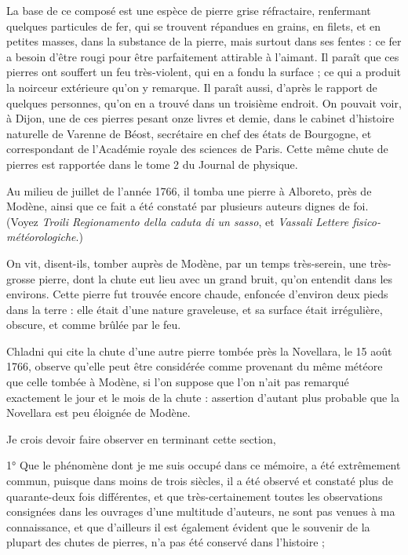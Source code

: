\documentclass[a4paper, 12pt, oneside, french]{article}
\begin{document}
La base de ce composé est une espèce de pierre grise réfractaire, renfermant quelques particules de fer, qui se trouvent répandues en grains, en filets, et en petites masses, dans la substance de la pierre, mais surtout dans ses fentes : ce fer a besoin d'être rougi pour être parfaitement attirable à l'aimant. Il paraît que ces pierres ont souffert un feu très-violent, qui en a fondu la surface ; ce qui a produit la noirceur extérieure qu'on y remarque. Il paraît aussi, d'après le rapport de quelques personnes, qu'on en a trouvé dans un troisième endroit. On pouvait voir, à Dijon, une de ces pierres pesant onze livres et demie, dans le cabinet d'histoire naturelle de Varenne de Béost, secrétaire en chef des états de Bourgogne, et correspondant de l'Académie royale des sciences de Paris. Cette même chute de pierres est rapportée dans le tome 2 du Journal de physique.

Au milieu de juillet de l'année 1766, il tomba une pierre à Alboreto, près de Modène, ainsi que ce fait a été constaté par plusieurs auteurs dignes de foi. (Voyez \emph{Troili Regionamento della caduta di un sasso}, et \emph{Vassali Lettere fisico-météorologiche}.)

On vit, disent-ils, tomber auprès de Modène, par un temps très-serein, une très-grosse pierre, dont la chute eut lieu avec un grand bruit, qu'on entendit dans les environs. Cette pierre fut trouvée encore chaude, enfoncée d'environ deux pieds dans la terre : elle était d'une nature graveleuse, et sa surface était irrégulière, obscure, et comme brûlée par le feu.

Chladni qui cite la chute d'une autre pierre tombée près la Novellara, le 15 août 1766, observe qu'elle peut être considérée comme provenant du même météore que celle tombée à Modène, si l'on suppose que l'on n'ait pas remarqué exactement le jour et le mois de la chute : assertion d'autant plus probable que la Novellara est peu éloignée de Modène.

Je crois devoir faire observer en terminant cette section,

1° Que le phénomène dont je me suis occupé dans ce mémoire, a été extrêmement commun, puisque dans moins de trois siècles, il a été observé et constaté plus de quarante-deux fois différentes, et que très-certainement toutes les observations consignées dans les ouvrages d'une multitude d'auteurs, ne sont pas venues à ma connaissance, et que d'ailleurs il est également évident que le souvenir de la plupart des chutes de pierres, n'a pas été conservé dans l'histoire ;
\end{document}
